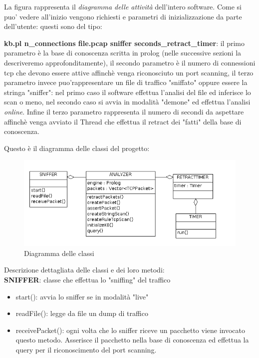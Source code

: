 \documentclass[a4paper,12pt]{article} %
\begin{document}
La figura rappresenta il \emph{diagramma delle attività} dell'intero software. Come si puo' vedere
all'inizio vengono richiesti e parametri di inizializzazione da parte dell'utente: questi sono del tipo: 



\textbf{kb.pl n\_connections file.pcap sniffer seconds\_retract\_timer}: il primo parametro è la base di conoscenza
scritta in prolog (nelle successive sezioni la descriveremo approfonditamente), il secondo parametro è il numero di connessioni
tcp che devono essere attive affinchè venga riconosciuto un port scanning, il terzo parametro invece puo'rappresentare un 
file di traffico "sniffato" oppure essere la stringa "sniffer": nel primo caso il software effettua l'analisi del file ed inferisce
lo scan o meno, nel secondo caso si avvia in modalità "demone" ed effettua l'analisi \emph{online}. Infine il terzo parametro
rappresenta il numero di secondi da aspettare affinchè venga avviato il Thread che effettua il retract dei "fatti" della base di 
conoscenza.





Questo è il diagramma delle classi del progetto:



\begin{figure}[htbp]
\centering
\includegraphics[width=15cm]{classi.png}
\caption{\label{Diagramma delle classi} Diagramma delle classi}
\end{figure}


Descrizione dettagliata delle classi e dei loro metodi:\\


\textbf{SNIFFER}: classe che effettua lo "sniffing" del traffico

\begin{itemize}

\item start(): avvia lo sniffer se in modalità "live"
\item readFile(): legge da file un dump di traffico
\item receivePacket(): ogni volta che lo sniffer riceve un pacchetto viene invocato questo metodo.
Asserisce il pacchetto nella base di conoscenza ed effettua la query per il riconoscimento del port scanning.

\end{itemize}
\end{document}
